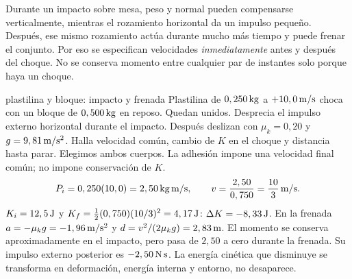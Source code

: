 \documentclass[11pt,a4paper]{article}
\begin{document}
Durante un impacto sobre mesa, peso y normal pueden compensarse verticalmente,
mientras el rozamiento horizontal da un impulso peque\~no. Despu\'es, ese mismo
rozamiento act\'ua durante mucho m\'as tiempo y puede frenar el conjunto.
Por eso se especifican velocidades \emph{inmediatamente} antes y despu\'es del choque.
No se conserva momento entre cualquier par de instantes solo porque haya un choque.

\begin{examplebox}{plastilina y bloque: impacto y frenada}
 Plastilina de $0,250\,\mathrm{kg}$ a $+10,0\,\mathrm{m/s}$ choca con un bloque
de $0,500\,\mathrm{kg}$ en reposo. Quedan unidos. Desprecia el impulso externo horizontal
durante el impacto. Despu\'es deslizan con $\mu_k=0,20$ y $g=9,81\,\mathrm{m/s^2}$.
Halla velocidad com\'un, cambio de $K$ en el choque y distancia hasta parar.
\solutionblock
{} Elegimos ambos cuerpos. La adhesi\'on impone una velocidad final
com\'un; no impone conservaci\'on de $K$.
\[
P_i=0,250(10,0)=2,50\,\mathrm{kg\,m/s},\qquad
v=\frac{2,50}{0,750}=\frac{10}{3}\,\mathrm{m/s}.
\]
$K_i=12,5\,\mathrm{J}$ y
$K_f=\tfrac12(0,750)(10/3)^2=4,17\,\mathrm{J}$:
$\Delta K=-8,33\,\mathrm{J}$.
En la frenada $a=-\mu_kg=-1,96\,\mathrm{m/s^2}$ y
$d=v^2/(2\mu_kg)=2,83\,\mathrm{m}$.
 El momento se conserva aproximadamente en el impacto,
pero pasa de $2,50$ a cero durante la frenada. Su impulso externo posterior es
$-2,50\,\mathrm{N\,s}$. La energ\'ia cin\'etica que disminuye se transforma
en deformaci\'on, energ\'ia interna y entorno, no desaparece.
\end{examplebox}
\end{document}
